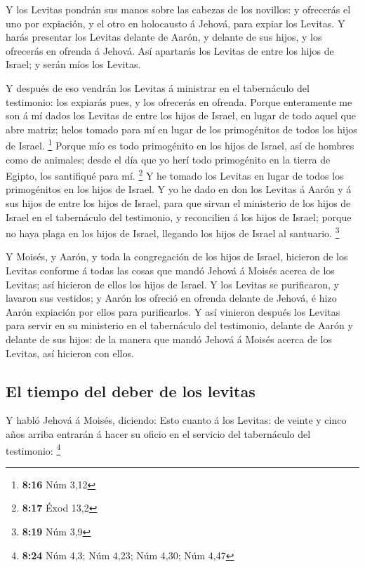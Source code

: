  Y los Levitas pondrán sus manos sobre las cabezas de los
novillos: y ofrecerás el uno por expiación, y el otro en holocausto á
Jehová, para expiar los Levitas.  Y harás presentar los
Levitas delante de Aarón, y delante de sus hijos, y los ofrecerás en
ofrenda á Jehová.  Así apartarás los Levitas de entre los
hijos de Israel; y serán míos los Levitas.

 Y después de eso vendrán los Levitas á ministrar en el
tabernáculo del testimonio: los expiarás pues, y los ofrecerás en
ofrenda.  Porque enteramente me son á mí dados los Levitas
de entre los hijos de Israel, en lugar de todo aquel que abre matriz;
helos tomado para mí en lugar de los primogénitos de todos los hijos de
Israel. \footnote{\textbf{8:16} Núm 3,12}  Porque mío es
todo primogénito en los hijos de Israel, así de hombres como de
animales; desde el día que yo herí todo primogénito en la tierra de
Egipto, los santifiqué para mí. \footnote{\textbf{8:17} Éxod 13,2}
 Y he tomado los Levitas en lugar de todos los primogénitos
en los hijos de Israel.  Y yo he dado en don los Levitas á
Aarón y á sus hijos de entre los hijos de Israel, para que sirvan el
ministerio de los hijos de Israel en el tabernáculo del testimonio, y
reconcilien á los hijos de Israel; porque no haya plaga en los hijos de
Israel, llegando los hijos de Israel al santuario. \footnote{\textbf{8:19}
  Núm 3,9}

 Y Moisés, y Aarón, y toda la congregación de los hijos de
Israel, hicieron de los Levitas conforme á todas las cosas que mandó
Jehová á Moisés acerca de los Levitas; así hicieron de ellos los hijos
de Israel.  Y los Levitas se purificaron, y lavaron sus
vestidos; y Aarón los ofreció en ofrenda delante de Jehová, é hizo Aarón
expiación por ellos para purificarlos.  Y así vinieron
después los Levitas para servir en su ministerio en el tabernáculo del
testimonio, delante de Aarón y delante de sus hijos: de la manera que
mandó Jehová á Moisés acerca de los Levitas, así hicieron con ellos.

\hypertarget{el-tiempo-del-deber-de-los-levitas}{%
\subsection{El tiempo del deber de los
levitas}\label{el-tiempo-del-deber-de-los-levitas}}

 Y habló Jehová á Moisés, diciendo:  Esto
cuanto á los Levitas: de veinte y cinco años arriba entrarán á hacer su
oficio en el servicio del tabernáculo del testimonio: \footnote{\textbf{8:24}
  Núm 4,3; Núm 4,23; Núm 4,30; Núm 4,47}

